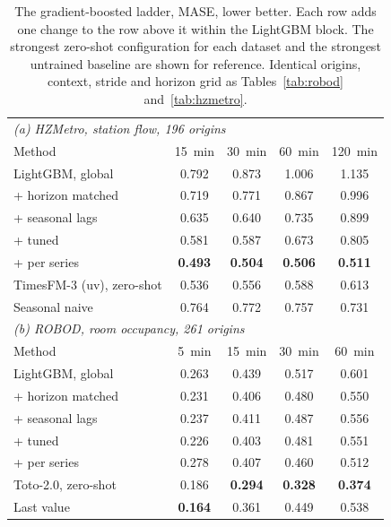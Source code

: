 \documentclass[utf8]{FrontiersinHarvard}
\newif\ifrevisionmarkup
\newcommand{\new}[1]{\ifrevisionmarkup\textcolor{revision}{#1}\else#1\fi}
\newif\ifsecondrevisionmarkup
\newcommand{\rev}[1]{\ifsecondrevisionmarkup\textcolor{revisiontwo}{#1}\else#1\fi}
\theoremstyle{plain}
\theoremstyle{definition}
\theoremstyle{remark}
\newcommand{\best}[1]{\textbf{#1}}
\begin{document}
\new{\begin{table}[htbp]
\centering
\caption{\new{The gradient-boosted ladder, MASE, lower better. Each row adds one change to the row above it within the LightGBM block. The strongest zero-shot configuration for each dataset and the strongest untrained baseline are shown for reference. Identical origins, context, stride and horizon grid as Tables~\ref{tab:robod} and~\ref{tab:hzmetro}.}}
\label{tab:lgbm}
\small
\begin{tabular}{lcccc}
\toprule
\multicolumn{5}{l}{\emph{(a) HZMetro, station flow, \num{196} origins}}\\
Method & \SI{15}{\minute} & \SI{30}{\minute} & \SI{60}{\minute} & \SI{120}{\minute} \\
\midrule
\rev{LightGBM, global}      & 0.792 & 0.873 & 1.006 & 1.135 \\
\quad + horizon matched     & 0.719 & 0.771 & 0.867 & 0.996 \\
\quad + seasonal lags       & 0.635 & 0.640 & 0.735 & 0.899 \\
\quad + tuned               & 0.581 & 0.587 & 0.673 & 0.805 \\
\quad + per series          & \best{0.493} & \best{0.504} & \best{0.506} & \best{0.511} \\
\midrule
TimesFM-3 (uv), zero-shot   & 0.536 & 0.556 & 0.588 & 0.613 \\
Seasonal naive              & 0.764 & 0.772 & 0.757 & 0.731 \\
\midrule
\multicolumn{5}{l}{\emph{(b) ROBOD, room occupancy, \num{261} origins}}\\
Method & \SI{5}{\minute} & \SI{15}{\minute} & \SI{30}{\minute} & \SI{60}{\minute} \\
\midrule
\rev{LightGBM, global}      & 0.263 & 0.439 & 0.517 & 0.601 \\
\quad + horizon matched     & 0.231 & 0.406 & 0.480 & 0.550 \\
\quad + seasonal lags       & 0.237 & 0.411 & 0.487 & 0.556 \\
\quad + tuned               & 0.226 & 0.403 & 0.481 & 0.551 \\
\quad + per series          & 0.278 & 0.407 & 0.460 & 0.512 \\
\midrule
Toto-2.0, zero-shot         & 0.186 & \best{0.294} & \best{0.328} & \best{0.374} \\
Last value                  & \best{0.164} & 0.361 & 0.449 & 0.538 \\
\bottomrule
\end{tabular}
\end{table}}
\end{document}
